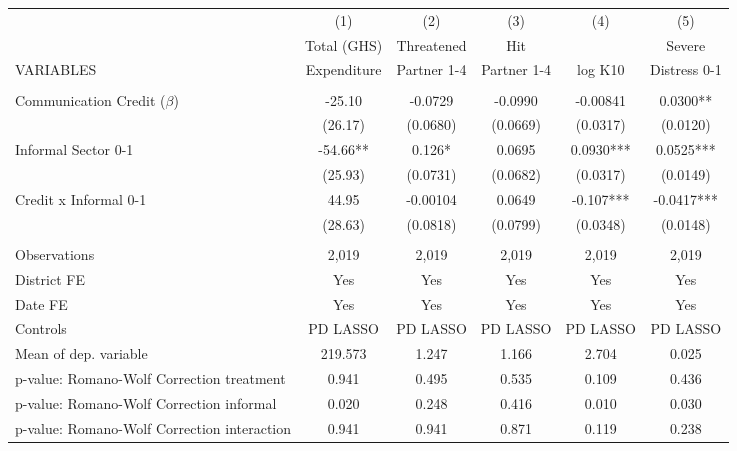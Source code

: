 \begin{tabular}{lccccc} \hline
 & (1) & (2) & (3) & (4) & (5) \\
 & Total (GHS) & Threatened & Hit &  & Severe \\
VARIABLES & Expenditure & Partner 1-4 & Partner 1-4 & log K10 & Distress 0-1 \\ \hline
 &  &  &  &  &  \\
Communication Credit ($\beta$) & -25.10 & -0.0729 & -0.0990 & -0.00841 & 0.0300** \\
 & (26.17) & (0.0680) & (0.0669) & (0.0317) & (0.0120) \\
Informal Sector 0-1 & -54.66** & 0.126* & 0.0695 & 0.0930*** & 0.0525*** \\
 & (25.93) & (0.0731) & (0.0682) & (0.0317) & (0.0149) \\
Credit x Informal 0-1 & 44.95 & -0.00104 & 0.0649 & -0.107*** & -0.0417*** \\
 & (28.63) & (0.0818) & (0.0799) & (0.0348) & (0.0148) \\
 &  &  &  &  &  \\
Observations & 2,019 & 2,019 & 2,019 & 2,019 & 2,019 \\
District FE & Yes & Yes & Yes & Yes & Yes \\
Date FE & Yes & Yes & Yes & Yes & Yes \\
Controls & PD LASSO & PD LASSO & PD LASSO & PD LASSO & PD LASSO \\
Mean of dep. variable & 219.573 & 1.247 & 1.166 & 2.704 & 0.025 \\
p-value: Romano-Wolf Correction treatment & 0.941 & 0.495 & 0.535 & 0.109 & 0.436 \\
p-value: Romano-Wolf Correction informal & 0.020 & 0.248 & 0.416 & 0.010 & 0.030 \\
 p-value: Romano-Wolf Correction interaction & 0.941 & 0.941 & 0.871 & 0.119 & 0.238 \\ \hline
\end{tabular}
